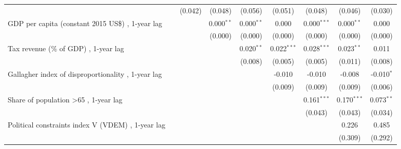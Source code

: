 \begin{table}[htbp]
\begin{tabular}{lcccccccc}
                                                                                  &                & (0.042)       & (0.048)       & (0.056)       & (0.051)       & (0.048)        & (0.046)       & (0.030)\\   
      GDP per capita (constant 2015 US\$) , 1-year lag                            &                &               & 0.000$^{**}$  & 0.000$^{**}$  & 0.000         & 0.000$^{***}$  & 0.000$^{**}$  & 0.000\\   
                                                                                  &                &               & (0.000)       & (0.000)       & (0.000)       & (0.000)        & (0.000)       & (0.000)\\   
      Tax revenue (\% of GDP) , 1-year lag                                        &                &               &               & 0.020$^{**}$  & 0.022$^{***}$ & 0.028$^{***}$  & 0.023$^{**}$  & 0.011\\   
                                                                                  &                &               &               & (0.008)       & (0.005)       & (0.005)        & (0.011)       & (0.008)\\   
      Gallagher index of disproportionality , 1-year lag                          &                &               &               &               & -0.010        & -0.010         & -0.008        & -0.010$^{*}$\\   
                                                                                  &                &               &               &               & (0.009)       & (0.009)        & (0.009)       & (0.006)\\   
      Share of population >65 , 1-year lag                                        &                &               &               &               &               & 0.161$^{***}$  & 0.170$^{***}$ & 0.073$^{**}$\\   
                                                                                  &                &               &               &               &               & (0.043)        & (0.043)       & (0.034)\\   
      Political constraints index V (VDEM) , 1-year lag                           &                &               &               &               &               &                & 0.226         & 0.485\\   
                                                                                  &                &               &               &               &               &                & (0.309)       & (0.292)\\   

\end{tabular}
\end{table}
